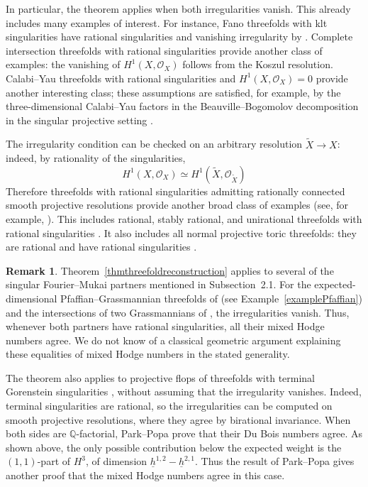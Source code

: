 \documentclass{amsart}
\theoremstyle{plain}
\theoremstyle{definition}
\newtheorem{remark}[prop]{Remark}
\newcommand{\bbQ}{\mathbb{Q}}
\begin{document}
In particular, the theorem applies when both irregularities vanish.
This already includes many examples of interest. For instance, Fano threefolds with klt singularities have rational singularities and vanishing irregularity by
\cite[Theorems~5.22 and~2.70]{KM98}.
Complete intersection threefolds with rational singularities provide another class of examples: the vanishing of
$H^1(X,\mathcal O_X)$ follows from the Koszul resolution.
Calabi--Yau threefolds with rational singularities and
$H^1(X,\mathcal O_X)=0$ provide another interesting class;
these assumptions are satisfied, for example, by the three-dimensional Calabi--Yau factors in the Beauville--Bogomolov decomposition in the singular projective setting \cite[Definition~1.4 and Theorem~1.5]{HP19}.

The irregularity condition can be checked on an arbitrary resolution $\widetilde X\to X$: indeed, by rationality of the singularities,
\begin{equation}\label{rationalsingirr}
H^1(X,\mathcal O_X)
\simeq H^1(\widetilde X,\mathcal O_{\widetilde X})
\end{equation}
Therefore threefolds with rational singularities admitting rationally connected smooth projective resolutions provide another broad class of examples (see, for example, \cite[Proposition~2.5(b)]{Deb24}). This includes rational, stably rational, and unirational threefolds with rational singularities
\cite[(1)]{Deb24}.
It also includes all normal projective toric threefolds:
they are rational and have rational singularities
\cite[Theorem~11.4.2]{CLS11}.

\begin{remark}
Theorem~\ref{thmthreefoldreconstruction} applies to several of the singular Fourier--Mukai partners mentioned in Subsection~2.1. For the expected-dimensional Pfaffian--Grassmannian threefolds of \cite[Theorem~11.4]{Kuz06} (see Example~\ref{examplePfaffian}) and the intersections of two Grassmannians of \cite[Theorem~1.1]{BCP20}, the irregularities vanish. Thus, whenever both partners have rational singularities, all their mixed Hodge numbers agree. We do not know of a classical geometric argument explaining these equalities of mixed Hodge numbers in the stated generality.

The theorem also applies to projective flops of threefolds with terminal Gorenstein singularities \cite[Theorem~1.1]{Che02}, without assuming that the irregularity vanishes. Indeed, terminal singularities are rational, so the irregularities can be computed on smooth projective resolutions, where they agree by birational invariance. When both sides are $\bbQ$-factorial, Park--Popa \cite[Corollary~8.1]{PP25b} prove that their Du Bois numbers agree. As shown above, the only possible contribution below the expected weight is the $(1,1)$-part of $H^3$, of dimension
$\underline h^{1,2}-\underline h^{2,1}$. Thus the result of Park--Popa gives another proof that the mixed Hodge numbers agree in this case.
\end{remark}
\end{document}
